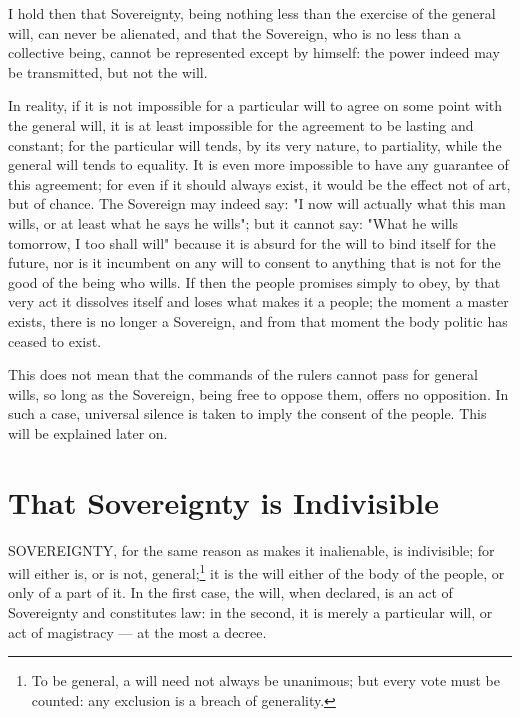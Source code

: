 \documentclass[12pt]{book}
\begin{document}
I hold then that Sovereignty, being nothing less than the exercise of the general will, can never be alienated, and that the Sovereign, who is no less than a collective being, cannot be represented except by himself: the power indeed may be transmitted, but not the will.

In reality, if it is not impossible for a particular will to agree on some point with the general will, it is at least impossible for the agreement to be lasting and constant; for the particular will tends, by its very nature, to partiality, while the general will tends to equality. It is even more impossible to have any guarantee of this agreement; for even if it should always exist, it would be the effect not of art, but of chance. The Sovereign may indeed say: "I now will actually what this man wills, or at least what he says he wills"; but it cannot say: "What he wills tomorrow, I too shall will" because it is absurd for the will to bind itself for the future, nor is it incumbent on any will to consent to anything that is not for the good of the being who wills. If then the people promises simply to obey, by that very act it dissolves itself and loses what makes it a people; the moment a master exists, there is no longer a Sovereign, and from that moment the body politic has ceased to exist.

This does not mean that the commands of the rulers cannot pass for general wills, so long as the Sovereign, being free to oppose them, offers no opposition. In such a case, universal silence is taken to imply the consent of the people. This will be explained later on.

\section{That Sovereignty is Indivisible}
SOVEREIGNTY, for the same reason as makes it inalienable, is indivisible; for will either is, or is not, general;\footnote{To be general, a will need not always be unanimous; but every vote must be counted: any exclusion is a breach of generality.} it is the will either of the body of the people, or only of a part of it. In the first case, the will, when declared, is an act of Sovereignty and constitutes law: in the second, it is merely a particular will, or act of magistracy — at the most a decree.
\end{document}
